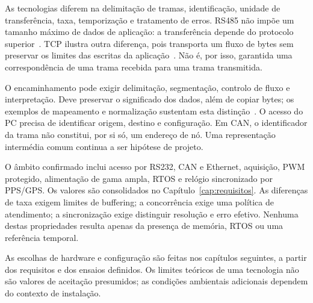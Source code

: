 As tecnologias diferem na delimitação de tramas, identificação, unidade
de transferência, taxa, temporização e tratamento de erros. RS485 não
impõe um tamanho máximo de dados de aplicação: a transferência depende
do protocolo superior~\cite{ti_rs485_an1057_2013,modbus_serial_2006}.
TCP ilustra outra diferença, pois transporta um fluxo de bytes sem
preservar os limites das escritas da aplicação~\cite[sec.~3.7]{eddy_tcp_2022}.
Não é, por isso, garantida uma correspondência de uma trama recebida
para uma trama transmitida.

O encaminhamento pode exigir delimitação, segmentação, controlo de
fluxo e interpretação. Deve preservar o significado dos dados, além de
copiar bytes; os exemplos de mapeamento e normalização sustentam esta
distinção~\cite{eddy_tcp_2022,castellanos_gateway_2021}. O acesso do PC
precisa de identificar origem, destino e configuração. Em CAN, o
identificador da trama não constitui, por si só, um endereço de nó.
Uma representação intermédia comum continua a ser hipótese de projeto.

O âmbito confirmado inclui acesso por RS232, CAN e Ethernet, aquisição,
PWM protegido, alimentação de gama ampla, RTOS e relógio sincronizado
por PPS/GPS. Os valores são consolidados no Capítulo~\ref{cap:requisitos}.
As diferenças de taxa exigem limites de buffering; a concorrência exige
uma política de atendimento; a sincronização exige distinguir resolução
e erro efetivo. Nenhuma destas propriedades resulta apenas da presença
de memória, RTOS ou uma referência temporal.

As escolhas de hardware e configuração são feitas nos capítulos
seguintes, a partir dos requisitos e dos ensaios definidos. Os limites teóricos de uma tecnologia não
são valores de aceitação presumidos; as condições ambientais adicionais
dependem do contexto de instalação.
